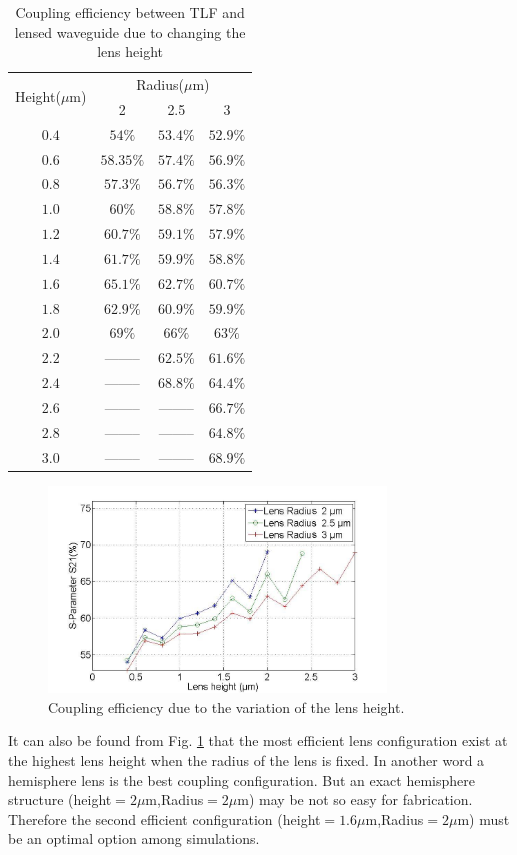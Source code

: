 \begin{table}
\caption{Coupling efficiency between TLF and lensed waveguide due to changing the lens height}
\centering
\begin{tabular}{|c|c|c|c|}
\hline
\multirow{2}{*}{Height($\mu$m)}&\multicolumn{3}{c|}{Radius($\mu$m)}\\
\cline{2-4}
 			&	2&	2.5&	3\\
\hline
$0.4$&$54\%$&$53.4\%$&$52.9\%$\\
$0.6$&$58.35\%$&$57.4\%$&$56.9\%$\\
$0.8$&$57.3\%$&$56.7\%$&$56.3\%$\\
$1.0$&$60\%$&$58.8\%$&$57.8\%$\\
$1.2$&$60.7\%$&$59.1\%$&$57.9\%$\\
$1.4$&$61.7\%$&$59.9\%$&$58.8\%$\\
$1.6$&$65.1\%$&$62.7\%$&$60.7\%$\\
$1.8$&$62.9\%$&$60.9\%$&$59.9\%$\\
$2.0$&$69\%$  &  $66\%$&$63\%$\\
$2.2$&--------&$62.5\%$&$61.6\%$\\
$2.4$&--------&$68.8\%$&$64.4\%$\\
$2.6$&--------&--------&$66.7\%$\\
$2.8$&--------&--------&$64.8\%$\\
$3.0$&--------&--------&$68.9\%$\\
\hline
\end{tabular}
\label{tab:coupling_lensed_waveguide_height}
\end{table}
\begin{figure}[!ht]
\centering
\includegraphics[width=0.8\textwidth]{bilder/s21_fix_lens_radium_hxx}
\caption{Coupling efficiency due to the variation of the lens height.}
\label{fig:coupling_lenses_curve_hxx}
\end{figure}
It can also be found from Fig. \ref{fig:coupling_lenses_curve_hxx} that the most efficient lens configuration exist at the highest lens height when the radius of the lens is fixed. In another word a hemisphere lens is the best coupling configuration. But an exact hemisphere structure (height$=2\mu$m,Radius$=2\mu$m) may be not so easy for fabrication. Therefore the second efficient configuration (height$=1.6\mu$m,Radius$=2\mu$m) must be  an optimal option among simulations.\\ 

